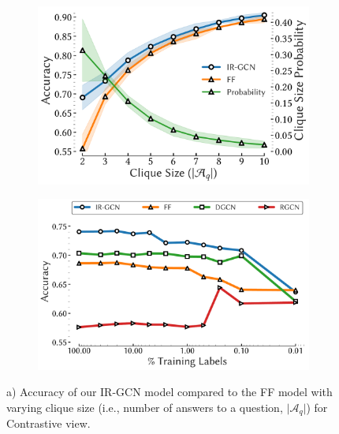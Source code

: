 \begin{figure}[tbh]
  \begin{subfigure}{0.4\textwidth}
    \centering
    \includegraphics[scale=0.26]{figures/clique_acc.pdf}
    \caption{\small \label{fig:clique}}
  \end{subfigure} \hspace{0.3in}
  \begin{subfigure}{0.55\textwidth}
      \centering
  \includegraphics[scale=0.25]{figures/sparsity_acc_physics.pdf}
  \caption{\small\label{fig:labelsparsity} }
  \end{subfigure}
  \caption{\small a) Accuracy of our IR-GCN model compared to the FF model with varying clique size (i.e., number of answers to a question, $\vert \mathcal{A}_q \vert$) for Contrastive view. %
}
\end{figure}
